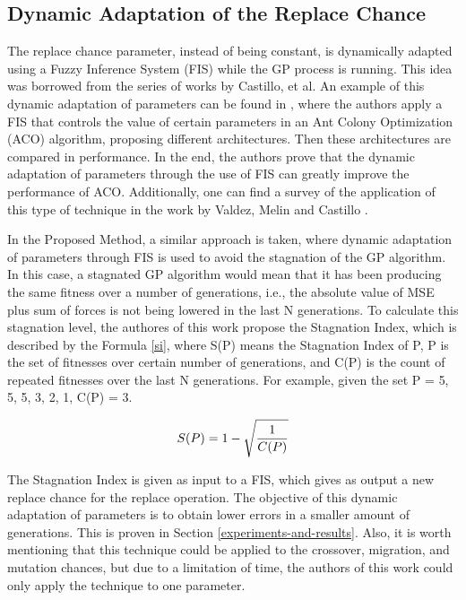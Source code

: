 \documentclass[12pt,journal,draftcls,onecolumn]{IEEEtran}
\begin{document}
\subsection{Dynamic Adaptation of the Replace Chance}
\label{dynamic-adaptation-of-the-replace-chance}

The replace chance parameter, instead of being constant, is dynamically adapted using a Fuzzy Inference System (FIS) while the GP process is running. This idea was borrowed from the series of works by Castillo, et al. An example of this dynamic adaptation of parameters can be found in \cite{castillo2015new}, where the authors apply a FIS that controls the value of certain parameters in an Ant Colony Optimization (ACO) algorithm, proposing different architectures. Then these architectures are compared in performance. In the end, the authors prove that the dynamic adaptation of parameters through the use of FIS can greatly improve the performance of ACO. Additionally, one can find a survey of the application of this type of technique in the work by Valdez, Melin and Castillo \cite{valdez2014survey}.

In the Proposed Method, a similar approach is taken, where dynamic adaptation of parameters through FIS is used to avoid the stagnation of the GP algorithm. In this case, a stagnated GP algorithm would mean that it has been producing the same fitness over a number of generations, i.e., the absolute value of MSE plus sum of forces is not being lowered in the last N generations. To calculate this stagnation level, the authores of this work propose the Stagnation Index, which is described by the Formula \ref{si}, where S(P) means the Stagnation Index of P, P is the set of fitnesses over certain number of generations, and C(P) is the count of repeated fitnesses over the last N generations. For example, given the set P = {5, 5, 5, 3, 2, 1}, C(P) = 3.

\begin{equation} \label{si}
S(P) = 1 - \sqrt{1 \over C(P)}
\end{equation}

The Stagnation Index is given as input to a FIS, which gives as output a new replace chance for the replace operation. The objective of this dynamic adaptation of parameters is to obtain lower errors in a smaller amount of generations. This is proven in Section \ref{experiments-and-results}. Also, it is worth mentioning that this technique could be applied to the crossover, migration, and mutation chances, but due to a limitation of time, the authors of this work could only apply the technique to one parameter.
\end{document}
